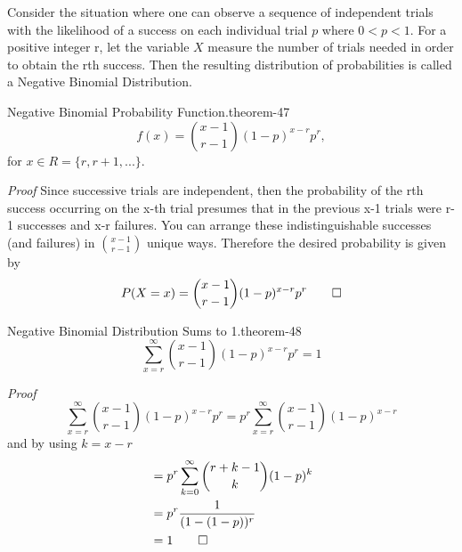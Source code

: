 \documentclass[10pt,]{book}
\makeatletter
\renewcommand*{\proofname}{Proof}
\renewenvironment{proof}[1][\proofname]{\par
  \pushQED{\qed}%
  \normalfont \topsep6\p@\@plus6\p@\relax
  \trivlist
  \item\relax
    {\itshape
    #1\@addpunct{.}}\hspace\labelsep\ignorespaces
}{%
  \popQED\endtrivlist\@endpefalse
}
\numberwithin{equation}{section}
\newcommand{\lt}{<}
\makeatother
\begin{document}
%
\par
\hypertarget{p-905}{}%
Consider the situation where one can observe a sequence  of independent trials with the likelihood of a success on each individual trial \(p\) where \(0 \lt p \lt 1 \). For a positive integer r, let the variable \(X\) measure the number of trials needed in order to obtain the rth success. Then the resulting distribution of probabilities is called a Negative Binomial Distribution.%
\par
\hypertarget{p-906}{}%
\begin{theorem}{Negative Binomial Probability Function.}{}{theorem-47}%
\hypertarget{NegativeBinomialProbabilityFunction}{}%
%
\begin{equation*}
f(x) = \binom{x - 1}{r-1}(1-p)^{x-r}p^r,
\end{equation*}
for \(x \in R = \{r, r+1, ... \}\).%
\end{theorem}
\begin{proof}\hypertarget{proof-49}{}
\hypertarget{p-908}{}%
Since successive trials are independent, then the probability of the rth success occurring on the x-th trial presumes that in the previous x-1 trials were r-1 successes and x-r failures. You can arrange these indistinguishable successes (and failures) in \(\binom{x-1}{r-1}\) unique ways. Therefore the desired probability is given by%
\begin{gather*}
P(X=x) = \binom{x - 1}{r-1}(1-p)^{x-r}p^r\qedhere
\end{gather*}
%
\end{proof}
%
\par
\hypertarget{p-909}{}%
\begin{theorem}{Negative Binomial Distribution Sums to 1.}{}{theorem-48}%
\hypertarget{p-910}{}%
%
\begin{equation*}
\sum_{x=r}^{\infty} {\binom{x - 1}{r-1}(1-p)^{x-r}p^r} = 1
\end{equation*}
%
\end{theorem}
\begin{proof}\hypertarget{proof-50}{}
\hypertarget{p-911}{}%
%
\begin{equation*}
\sum_{x=r}^{\infty} {\binom{x - 1}{r-1}(1-p)^{x-r}p^r} = p^r \sum_{x=r}^{\infty} {\binom{x - 1}{r-1}(1-p)^{x-r}}
\end{equation*}
\hypertarget{p-912}{}%
and by using \(k = x-r\)%
%
\begin{align*}
& = p^r \sum_{k=0}^{\infty} {\binom{r + k - 1}{k}(1-p)^k}\\
& = p^r \frac{1}{(1-(1-p))^r}\\
& = 1\qedhere
\end{align*}
%
\end{proof}
\end{document}
